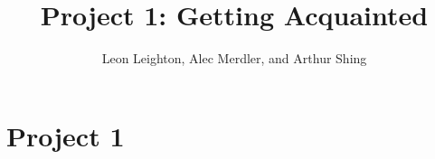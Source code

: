\documentclass[journal, letterpaper, draftclsnofoot, onecolumn, 10pt]{IEEEtran}
\begin{document}
\title{Project 1: Getting Acquainted}
\author{Leon Leighton, Alec Merdler, and Arthur Shing}

\begin{titlepage}
    \centering
    \maketitle
    \begin{abstract}
    \end{abstract}


\end{titlepage}

\tableofcontents
\clearpage


\section{Project 1}
\end{document}

